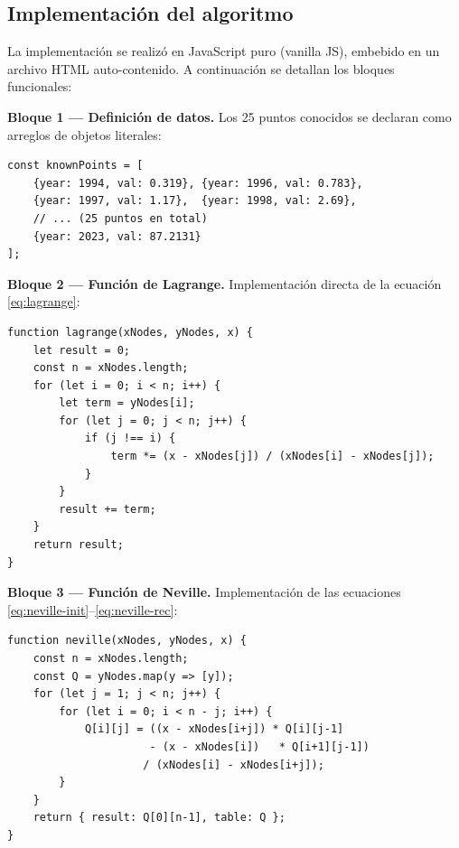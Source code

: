 \documentclass[12pt, letterpaper]{article}
\begin{document}
\subsection{Implementación del algoritmo}\label{subsec:implementacion}

La implementación se realizó en JavaScript puro (vanilla JS), embebido en un archivo HTML auto-contenido. A continuación se detallan los bloques funcionales:

\textbf{Bloque 1 --- Definición de datos.} Los 25 puntos conocidos se declaran como arreglos de objetos literales:

\begin{lstlisting}[style=pseudocode, caption={Definición de datos conocidos}, label={lst:datos}]
const knownPoints = [
    {year: 1994, val: 0.319}, {year: 1996, val: 0.783},
    {year: 1997, val: 1.17},  {year: 1998, val: 2.69},
    // ... (25 puntos en total)
    {year: 2023, val: 87.2131}
];
\end{lstlisting}

\textbf{Bloque 2 --- Función de Lagrange.} Implementación directa de la ecuación \eqref{eq:lagrange}:

\begin{lstlisting}[style=pseudocode, caption={Interpolación de Lagrange en JavaScript}, label={lst:lagrange}]
function lagrange(xNodes, yNodes, x) {
    let result = 0;
    const n = xNodes.length;
    for (let i = 0; i < n; i++) {
        let term = yNodes[i];
        for (let j = 0; j < n; j++) {
            if (j !== i) {
                term *= (x - xNodes[j]) / (xNodes[i] - xNodes[j]);
            }
        }
        result += term;
    }
    return result;
}
\end{lstlisting}

\textbf{Bloque 3 --- Función de Neville.} Implementación de las ecuaciones \eqref{eq:neville-init}--\eqref{eq:neville-rec}:

\begin{lstlisting}[style=pseudocode, caption={Algoritmo de Neville en JavaScript}, label={lst:neville}]
function neville(xNodes, yNodes, x) {
    const n = xNodes.length;
    const Q = yNodes.map(y => [y]);
    for (let j = 1; j < n; j++) {
        for (let i = 0; i < n - j; i++) {
            Q[i][j] = ((x - xNodes[i+j]) * Q[i][j-1]
                      - (x - xNodes[i])   * Q[i+1][j-1])
                     / (xNodes[i] - xNodes[i+j]);
        }
    }
    return { result: Q[0][n-1], table: Q };
}
\end{lstlisting}
\end{document}
